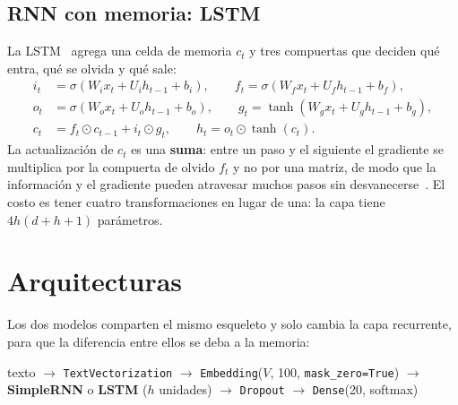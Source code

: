 \documentclass[12pt, a4paper]{article}
\begin{document}
\subsection{RNN con memoria: LSTM}

La LSTM~\cite{hochreiter1997} agrega una celda de memoria $c_t$ y tres compuertas que deciden qué entra, qué se olvida y qué sale:
\begin{align}
    i_t &= \sigma(W_i x_t + U_i h_{t-1} + b_i), \qquad
    f_t = \sigma(W_f x_t + U_f h_{t-1} + b_f), \\
    o_t &= \sigma(W_o x_t + U_o h_{t-1} + b_o), \qquad
    g_t = \tanh(W_g x_t + U_g h_{t-1} + b_g), \\
    c_t &= f_t \odot c_{t-1} + i_t \odot g_t, \qquad h_t = o_t \odot \tanh(c_t).
\end{align}
La actualización de $c_t$ es una \textbf{suma}: entre un paso y el siguiente el gradiente se multiplica por la compuerta de olvido $f_t$ y no por una matriz, de modo que la información y el gradiente pueden atravesar muchos pasos sin desvanecerse~\cite{hochreiter1997,goodfellow2016}. El costo es tener cuatro transformaciones en lugar de una: la capa tiene $4h(d+h+1)$ parámetros.

\section{Arquitecturas}\label{sec:arquitectura}

Los dos modelos comparten el mismo esqueleto y solo cambia la capa recurrente, para que la diferencia entre ellos se deba a la memoria:
\begin{center}
\small
texto $\rightarrow$ \texttt{TextVectorization} $\rightarrow$ \texttt{Embedding}($V$, 100, \texttt{mask\_zero=True}) $\rightarrow$ \textbf{SimpleRNN} o \textbf{LSTM} ($h$ unidades) $\rightarrow$ \texttt{Dropout} $\rightarrow$ \texttt{Dense}(20, softmax)
\end{center}
\end{document}
